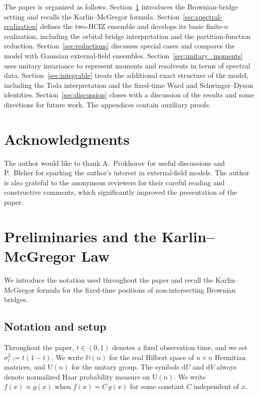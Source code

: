 \documentclass[11pt,a4paper]{article}
\theoremstyle{definition}\newtheorem{definition}[theorem]{Definition}
\theoremstyle{remark}\newtheorem{remark}[theorem]{Remark}
\numberwithin{equation}{section}
\newcommand{\dd}{\mathrm{d}}
\newcommand{\HH}{\mathbb{H}(n)}
\newcommand{\UU}{\mathrm{U}(n)}
\begin{document}
The paper is organized as follows. Section~\ref{sec:preliminaries} introduces the Brownian-bridge setting and recalls the Karlin--McGregor formula. Section~\ref{sec:spectral-realization} defines the two-HCIZ ensemble and develops its basic finite-$n$ realization, including the orbital bridge interpretation and the partition-function reduction. Section~\ref{sec:reductions} discusses special cases and compares the model with Gaussian external-field ensembles. Section~\ref{sec:unitary_moments} uses unitary invariance to represent moments and resolvents in terms of spectral data. Section~\ref{sec:integrable} treats the additional exact structure of the model, including the Toda interpretation and the fixed-time Ward and Schwinger--Dyson identities. Section~\ref{sec:discussion} closes with a discussion of the results and some directions for future work. The appendices contain auxiliary proofs.


\section*{Acknowledgments}

The author would like to thank A.~Prokhorov for useful discussions and P.~Bleher for sparking the author's interest in external-field models. The author is also grateful to the anonymous reviewers for their careful reading and constructive comments, which significantly improved the presentation of the paper.


\section{Preliminaries and the Karlin--McGregor Law}\label{sec:preliminaries}

We introduce the notation used throughout the paper and recall the Karlin--McGregor formula for the fixed-time positions of non-intersecting Brownian bridges.  

\subsection{Notation and setup}
\label{subsec:notation}

Throughout the paper, $t\in(0,1)$ denotes a fixed observation time, and we set $\sigma_t^2:=t(1-t)$. We write $\HH$ for the real Hilbert space of $n\times n$ Hermitian matrices,
  and $\UU$ for the unitary group. The symbols $\dd U$ and $\dd V$ always
denote normalized Haar probability measure on $\UU$. We write $f(x)\propto g(x)$ when $f(x)=C\,g(x)$ for some constant $C$ independent of $x$.
\end{document}
